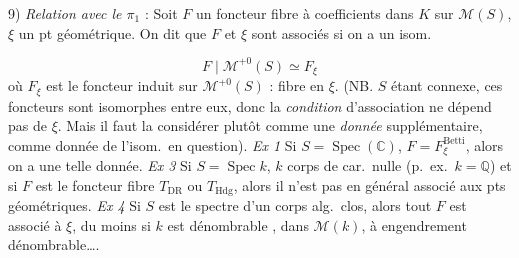 \documentclass[11pt,a4paper]{article}
\begin{document}
9) \emph{Relation avec le $\pi_{1}$ } : Soit $F$ un foncteur
fibre à coefficients dans $K$ sur $\mathcal{M}(S)$, $\xi$ un pt
géométrique. On dit que $F$ et $\xi$ sont associés si on a un isom.

\[
  F \mid \mathcal{M}^{+0}(S) \simeq F_{\xi}
\]
où $F_{\xi}$ est le foncteur induit sur $\mathcal{M}^{+0}(S)$ : fibre en
$\xi$. (NB. $S$ étant connexe, ces foncteurs sont isomorphes entre eux, donc
la \emph{condition} d'association ne dépend pas de $\xi$. Mais il faut la
considérer plutôt comme une \emph{donnée} supplémentaire, comme donnée de
l'isom.\ en question). \emph{Ex 1} Si $S = \operatorname{Spec}(\mathbb{C})$,
 $F = F^{\mathrm{Betti}}_{\xi}$,  alors on a une telle donnée. \emph{Ex 3} Si
$S = \operatorname{Spec} k$, $k$ corps de car.\ nulle (p.\ ex.\ $k = \mathbb{Q}$) et si $F$ est le foncteur fibre \struck{\ill{}}
 $T_{\mathrm{DR}}$ \struck{\ill{}} ou
$T_{\mathrm{Hdg}}$, alors il n'est pas en général associé aux pts
géométriques. \emph{Ex 4} Si  $S$ est le spectre d'un corps
alg.\ clos, alors tout $F$ est associé à $\xi$, du moins si $k$ est
dénombrable ,
dans $\mathcal{M}(k)$, à engendrement dénombrable….

\end{document}
